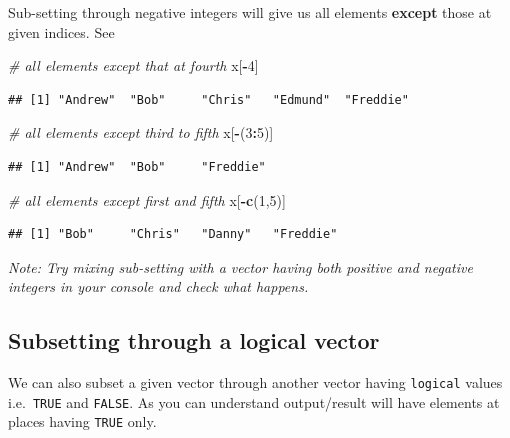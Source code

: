 \documentclass[
]{book}
\newenvironment{Shaded}{\begin{snugshade}}{\end{snugshade}}
\newcommand{\CommentTok}[1]{\textcolor[rgb]{0.56,0.35,0.01}{\textit{#1}}}
\newcommand{\DecValTok}[1]{\textcolor[rgb]{0.00,0.00,0.81}{#1}}
\newcommand{\FunctionTok}[1]{\textcolor[rgb]{0.13,0.29,0.53}{\textbf{#1}}}
\newcommand{\NormalTok}[1]{#1}
\newcommand{\SpecialCharTok}[1]{\textcolor[rgb]{0.81,0.36,0.00}{\textbf{#1}}}
\begin{document}
Sub-setting through negative integers will give us all elements \textbf{except} those at given indices. See

\begin{Shaded}
\begin{Highlighting}[]
\CommentTok{\# all elements except that at fourth}
\NormalTok{x[}\SpecialCharTok{{-}}\DecValTok{4}\NormalTok{]}
\end{Highlighting}
\end{Shaded}

\begin{verbatim}
## [1] "Andrew"  "Bob"     "Chris"   "Edmund"  "Freddie"
\end{verbatim}

\begin{Shaded}
\begin{Highlighting}[]
\CommentTok{\# all elements except third to fifth}
\NormalTok{x[}\SpecialCharTok{{-}}\NormalTok{(}\DecValTok{3}\SpecialCharTok{:}\DecValTok{5}\NormalTok{)]}
\end{Highlighting}
\end{Shaded}

\begin{verbatim}
## [1] "Andrew"  "Bob"     "Freddie"
\end{verbatim}

\begin{Shaded}
\begin{Highlighting}[]
\CommentTok{\# all elements except first and fifth}
\NormalTok{x[}\SpecialCharTok{{-}}\FunctionTok{c}\NormalTok{(}\DecValTok{1}\NormalTok{,}\DecValTok{5}\NormalTok{)]}
\end{Highlighting}
\end{Shaded}

\begin{verbatim}
## [1] "Bob"     "Chris"   "Danny"   "Freddie"
\end{verbatim}

\emph{Note: Try mixing sub-setting with a vector having both positive and negative integers in your console and check what happens.}

\hypertarget{subsetting-through-a-logical-vector}{%
\subsection{Subsetting through a logical vector}\label{subsetting-through-a-logical-vector}}

We can also subset a given vector through another vector having \texttt{logical} values i.e.~\texttt{TRUE} and \texttt{FALSE}. As you can understand output/result will have elements at places having \texttt{TRUE} only.
\end{document}
